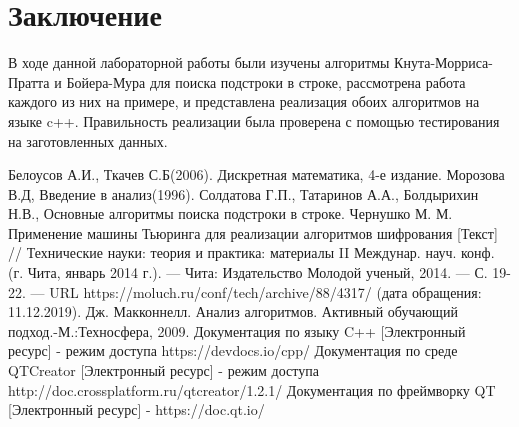 \documentclass[a4paper, 14pt]{article}
\begin{document}
        \section*{Заключение}
		В ходе данной лабораторной работы были изучены алгоритмы Кнута-Морриса-Пратта и Бойера-Мура для поиска подстроки в строке, рассмотрена работа каждого из них на примере, и представлена реализация обоих алгоритмов на языке c++. Правильность реализации была проверена с помощью тестирования на заготовленных данных.
    \begin{center}
    	\newpage
        
        \begin{thebibliography}{}
	 Белоусов А.И., Ткачев С.Б(2006). Дискретная математика, 4-е издание.
	  Морозова В.Д, Введение в анализ(1996).
	 Солдатова Г.П., Татаринов А.А., Болдырихин Н.В., Основные алгоритмы поиска подстроки в строке. 
	 Чернушко М. М. Применение машины Тьюринга для реализации алгоритмов шифрования [Текст] // Технические науки: теория и практика: материалы II Междунар. науч. конф. (г. Чита, январь 2014 г.). — Чита: Издательство Молодой ученый, 2014. — С. 19-22. — URL https://moluch.ru/conf/tech/archive/88/4317/ (дата обращения: 11.12.2019).
	  Дж. Макконнелл. Анализ алгоритмов. Активный обучающий подход.-М.:Техносфера, 2009.
	 Документация по языку C++ [Электронный ресурс] - режим доступа https://devdocs.io/cpp/
	 Документация по среде QTCreator [Электронный ресурс] - режим доступа http://doc.crossplatform.ru/qtcreator/1.2.1/	
	 Документация по фреймворку QT [Электронный ресурс] - https://doc.qt.io/
	\end{thebibliography}
	
	
	
        
    \end{center}        
\end{document}
